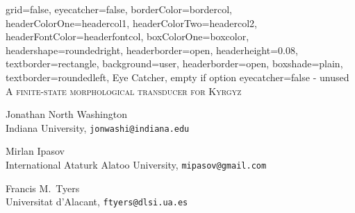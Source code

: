 \documentclass[a0paper,landscape,fontscale=0.285]{baposter}
\begin{document}
	\begin{poster}{
			grid=false,
			eyecatcher=false,
			borderColor=bordercol,
			headerColorOne=headercol1,
			headerColorTwo=headercol2,
			headerFontColor=headerfontcol,
			boxColorOne=boxcolor,
			headershape=roundedright,
  headerborder=open,
  headerheight=0.08\textheight,
			textborder=rectangle,
			background=user,
			headerborder=open,
			boxshade=plain,
			textborder=roundedleft,
		}{
			Eye Catcher, empty if option eyecatcher=false - unused
		}{
			{\vspace{0.5ex}
			{\titlefont \textsc{A finite-state morphological transducer for Kyrgyz}}}
		}{

			\vspace{-1.2em}
			{\begin{minipage}[t]{13em}
				\begin{spacing}{0.4}
					Jonathan North Washington\\
					{\small Indiana University, \texttt{jonwashi@indiana.edu}}
				\end{spacing}
			\end{minipage}
			\begin{minipage}[t]{17em}
				\begin{spacing}{0.4}
					Mirlan Ipasov\\
					{\small International Ataturk Alatoo University, \texttt{mipasov@gmail.com}}
				\end{spacing}
			\end{minipage}
			\begin{minipage}[t]{13em}
				\begin{spacing}{0.4}
					Francis M.\ Tyers\\
					{\small Universitat d'Alacant, \texttt{ftyers@dlsi.ua.es}}
				\end{spacing}
			\end{minipage}}

}
\end{poster}
\end{document}
